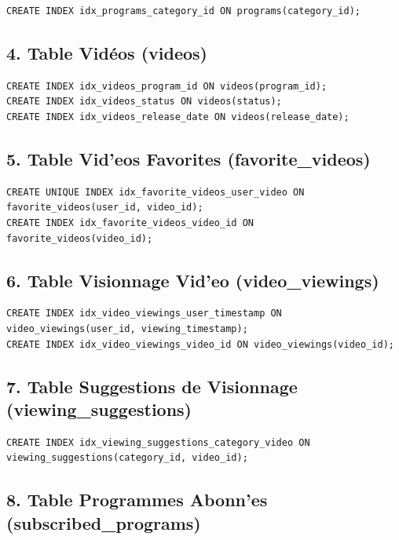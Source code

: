 \documentclass[a4paper, 12pt]{article}
\begin{document}
\begin{lstlisting}
CREATE INDEX idx_programs_category_id ON programs(category_id);
\end{lstlisting}

\subsection*{4. Table Vidéos (videos)}

\begin{lstlisting}
CREATE INDEX idx_videos_program_id ON videos(program_id);
CREATE INDEX idx_videos_status ON videos(status);
CREATE INDEX idx_videos_release_date ON videos(release_date);
\end{lstlisting}

\subsection*{5. Table Vid'eos Favorites (favorite\_videos)}

\begin{lstlisting}
CREATE UNIQUE INDEX idx_favorite_videos_user_video ON favorite_videos(user_id, video_id);
CREATE INDEX idx_favorite_videos_video_id ON favorite_videos(video_id);
\end{lstlisting}

\subsection*{6. Table Visionnage Vid'eo (video\_viewings)}

\begin{lstlisting}
CREATE INDEX idx_video_viewings_user_timestamp ON video_viewings(user_id, viewing_timestamp);
CREATE INDEX idx_video_viewings_video_id ON video_viewings(video_id);
\end{lstlisting}

\subsection*{7. Table Suggestions de Visionnage (viewing\_suggestions)}

\begin{lstlisting}
CREATE INDEX idx_viewing_suggestions_category_video ON viewing_suggestions(category_id, video_id);
\end{lstlisting}

\subsection*{8. Table Programmes Abonn'es (subscribed\_programs)}
\end{document}
